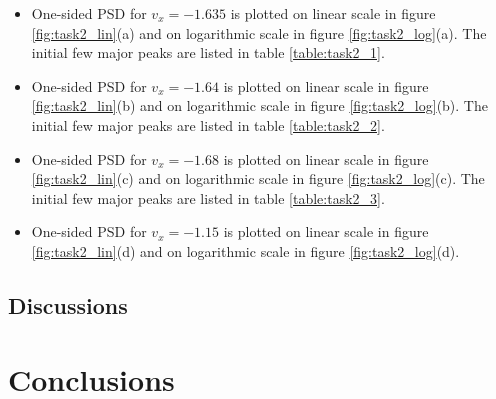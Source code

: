 \documentclass[a4paper]{article}
\begin{document}
		
		\begin{itemize}
			
			\item One-sided PSD for \(v_x = -1.635\) is plotted on linear scale in figure \ref{fig:task2_lin}(a) and on logarithmic scale in figure \ref{fig:task2_log}(a). The initial few major peaks are listed in table \ref{table:task2_1}.
			
			\item One-sided PSD for \(v_x = -1.64\) is plotted on linear scale in figure \ref{fig:task2_lin}(b) and on logarithmic scale in figure \ref{fig:task2_log}(b). The initial few major peaks are listed in table \ref{table:task2_2}.
			
			\item One-sided PSD for \(v_x = -1.68\) is plotted on linear scale in figure \ref{fig:task2_lin}(c) and on logarithmic scale in figure \ref{fig:task2_log}(c). The initial few major peaks are listed in table \ref{table:task2_3}.	
			
			\item One-sided PSD for \(v_x = -1.15\) is plotted on linear scale in figure \ref{fig:task2_lin}(d) and on logarithmic scale in figure \ref{fig:task2_log}(d).
						
		\end{itemize}
		
	
	\subsection{Discussions} \label{discussions2}
	
	
	\section{Conclusions} \label{conclusions}
	
	
\end{document}
